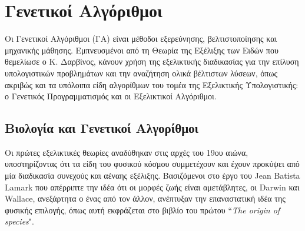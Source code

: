 \chapter{Γενετικοί Αλγόριθμοι}
\label{geneticAlgorithms}
Οι Γενετικοί Αλγόριθμοι (ΓΑ) είναι μέθοδοι εξερεύνησης, βελτιστοποίησης και μηχανικής μάθησης. Εμπνευσμένοι από τη Θεωρία της Εξέλιξης των Ειδών που θεμελίωσε ο Κ. Δαρβίνος, κάνουν χρήση της εξελικτικής διαδικασίας για την επίλυση υπολογιστικών προβλημάτων και την αναζήτηση ολικά βέλτιστων λύσεων, όπως ακριβώς και τα υπόλοιπα είδη αλγορίθμων του τομέα της Εξελικτικής Υπολογιστικής: ο Γενετικός Προγραμματισμός και οι Εξελικτικοί Αλγόριθμοι.

\section{Βιολογία και Γενετικοί Αλγορίθμοι}
Οι πρώτες εξελικτικές θεωρίες αναδύθηκαν στις αρχές του 19ου αιώνα, υποστηρίζοντας ότι τα είδη του φυσικού κόσμου συμμετέχουν και έχουν προκύψει από μία διαδικασία συνεχούς και αέναης εξέλιξης. Βασιζόμενοι στο έργο του Jean Batista Lamark που απέρριπτε την ιδέα ότι οι μορφές ζωής είναι αμετάβλητες, οι Darwin και Wallace, ανεξάρτητα ο ένας από τον άλλον, ανέπτυξαν την επαναστατική ιδέα της φυσικής επιλογής, όπως αυτή εκφράζεται στο βιβλίο του πρώτου “\emph{The origin of species}".
 
